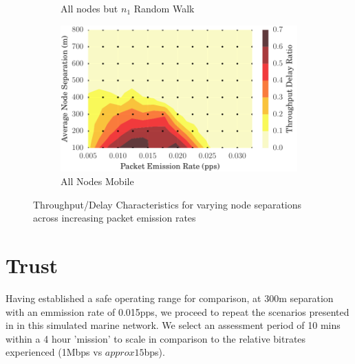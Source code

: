 \documentclass[runningheads,a4paper]{llncs}
\begin{document}
\begin{figure}
\begin{subfigure}{.5\textwidth}
  \caption{All nodes but $n_1$ Random Walk}
  \label{fig:throughput_allbut1}
\end{subfigure}
\begin{subfigure}{.5\textwidth}
\centering
  \includegraphics[width=.9\linewidth]{img/2d_ratio_all_mobile.pdf}
  \caption{All Nodes Mobile}
  \label{fig:throughput_all_mobile}
\end{subfigure}
\caption{Throughput/Delay Characteristics for varying node separations across increasing packet emission rates}
\label{fig:scenario_throughputratios_2d}
\end{figure}



\section{Trust}\label{sec:trustresultsanddiscussion}

Having established a safe operating range for comparison, at 300m separation with an emmission rate of 0.015pps, we proceed to repeat the scenarios presented in \cite{Guo11} in this simulated marine network. We select an assessment period of 10 mins within a 4 hour 'mission' to scale in comparison to the relative bitrates experienced (1Mbps vs $approx15$bps).
\end{document}
